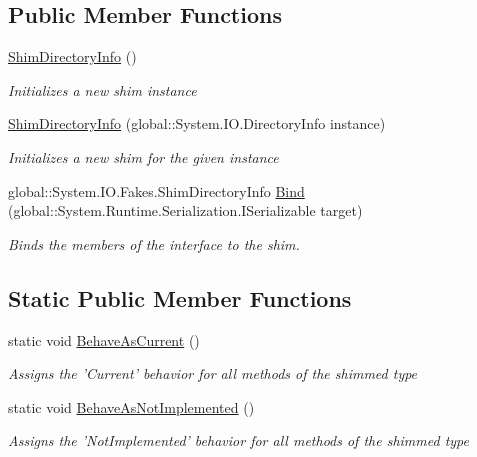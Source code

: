 \subsection*{Public Member Functions}
\begin{DoxyCompactItemize}
\item 
\hyperlink{class_system_1_1_i_o_1_1_fakes_1_1_shim_directory_info_a12bd9fb21e9ac95742707589c36b5cf4}{Shim\-Directory\-Info} ()
\begin{DoxyCompactList}\small\item\em Initializes a new shim instance\end{DoxyCompactList}\item 
\hyperlink{class_system_1_1_i_o_1_1_fakes_1_1_shim_directory_info_a1a0e9d59929e2b3fd49594410995ddd8}{Shim\-Directory\-Info} (global\-::\-System.\-I\-O.\-Directory\-Info instance)
\begin{DoxyCompactList}\small\item\em Initializes a new shim for the given instance\end{DoxyCompactList}\item 
global\-::\-System.\-I\-O.\-Fakes.\-Shim\-Directory\-Info \hyperlink{class_system_1_1_i_o_1_1_fakes_1_1_shim_directory_info_adce02b8522b2f53523f0190e0b1768e9}{Bind} (global\-::\-System.\-Runtime.\-Serialization.\-I\-Serializable target)
\begin{DoxyCompactList}\small\item\em Binds the members of the interface to the shim.\end{DoxyCompactList}\end{DoxyCompactItemize}
\subsection*{Static Public Member Functions}
\begin{DoxyCompactItemize}
\item 
static void \hyperlink{class_system_1_1_i_o_1_1_fakes_1_1_shim_directory_info_a8893f33ec722d0baf79a1c368e800673}{Behave\-As\-Current} ()
\begin{DoxyCompactList}\small\item\em Assigns the 'Current' behavior for all methods of the shimmed type\end{DoxyCompactList}\item 
static void \hyperlink{class_system_1_1_i_o_1_1_fakes_1_1_shim_directory_info_ad8f00569c59f318de17e14d3c3df4ba7}{Behave\-As\-Not\-Implemented} ()
\begin{DoxyCompactList}\small\item\em Assigns the 'Not\-Implemented' behavior for all methods of the shimmed type\end{DoxyCompactList}\end{DoxyCompactItemize}
